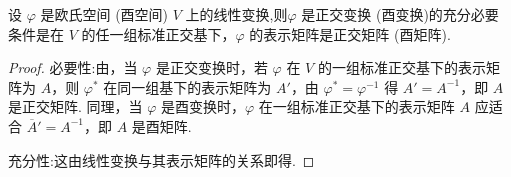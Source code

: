 \documentclass[../../main.tex]{subfiles}
\begin{document}
\begin{theorem}\label{theorem:正交变换和酉变换关于表示矩阵的充要条件}
设 $\varphi$ 是欧氏空间 (酉空间) $V$ 上的线性变换,则$\varphi$ 是正交变换 (酉变换)的充分必要条件是在 $V$ 的任一组标准正交基下，$\varphi$ 的表示矩阵是正交矩阵 (酉矩阵).
\end{theorem}
\begin{proof}
必要性:由，当 $\varphi$ 是正交变换时，若 $\varphi$ 在 $V$ 的一组标准正交基下的表示矩阵为 $A$，则 $\varphi^*$ 在同一组基下的表示矩阵为 $A'$，由 $\varphi^* = \varphi^{-1}$ 得 $A' = A^{-1}$，即 $A$ 是正交矩阵. 同理，当 $\varphi$ 是酉变换时，$\varphi$ 在一组标准正交基下的表示矩阵 $A$ 应适合 $\overline{A}' = A^{-1}$，即 $A$ 是酉矩阵.

充分性:这由线性变换与其表示矩阵的关系即得.
\end{proof}
\end{document}
